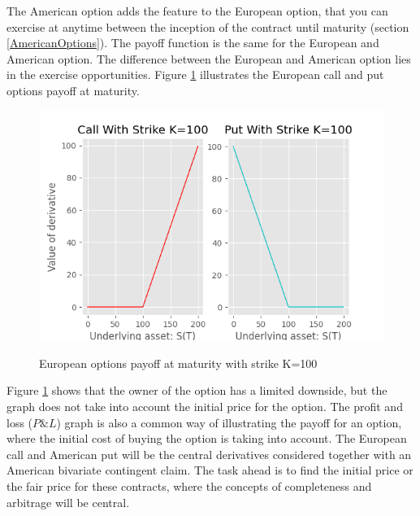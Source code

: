 The American option adds the feature to the European option, that you can exercise at anytime between the inception of the contract until maturity (section \ref{AmericanOptions}). The payoff function is the same for the European and American option. The difference between the European and American option lies in the exercise opportunities. Figure \ref{fig:contractfct} illustrates the European call and put options payoff at maturity. 

\begin{figure}[H]
\centering
\includegraphics{Figures/contractfct.png}\\
\decoRule
\caption[Contract Functions]{European options payoff at maturity with strike K=100}
\label{fig:contractfct}
\end{figure}

Figure \ref{fig:contractfct} shows that the owner of the option has a limited downside, but the graph does not take into account the initial price for the option. The profit and loss ($P\& L$) graph is also a common way of illustrating the payoff for an option, where the initial cost of buying the option is taking into account. The European call and American put will be the central derivatives considered together with an American bivariate contingent claim. The task ahead is to find the initial price or the fair price for these contracts, where the concepts of completeness and arbitrage will be central.


